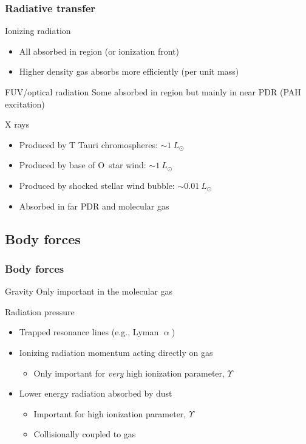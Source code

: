 \documentclass[presentation, draft]{beamer}
\begin{document}
\begin{frame}
  \frametitle{Radiative transfer}
  \begin{block}{Ionizing radiation}
    \begin{itemize}
    \item All absorbed in \hii{} region (or ionization front)
    \item Higher density gas absorbs more efficiently (per unit mass)
    \end{itemize}
  \end{block}
  \begin{block}{FUV/optical radiation}
    Some absorbed in \hii{} region but mainly in near PDR (PAH excitation)
  \end{block}
  \begin{block}{X rays}
    \begin{itemize}
    \item Produced by T Tauri chromospheres: \(\sim 1~L_\odot\)
    \item Produced by base of O~star wind: \(\sim 1~L_\odot\)
    \item Produced by shocked stellar wind bubble: \(\sim 0.01~L_\odot\)
    \item Absorbed in far PDR and molecular gas
    \end{itemize} 
  \end{block}
\end{frame}

\subsection{Body forces}

\begin{frame}
  \frametitle{Body forces}
  \begin{block}{Gravity}
    Only important in the molecular gas
  \end{block}
  \begin{block}{Radiation pressure}
    \begin{itemize}
    \item Trapped resonance lines (e.g., Lyman \(\upalpha\))
    \item Ionizing radiation momentum acting directly on gas
      \begin{itemize}
      \item Only important for \emph{very} high ionization parameter, \(\Upsilon\)
      \end{itemize}
    \item \alert{Lower energy radiation absorbed by dust}
      \begin{itemize}
      \item Important for high ionization parameter, \(\Upsilon\)
      \item Collisionally coupled to gas
      \end{itemize}
    \end{itemize}
  \end{block}
\end{frame}
\end{document}
